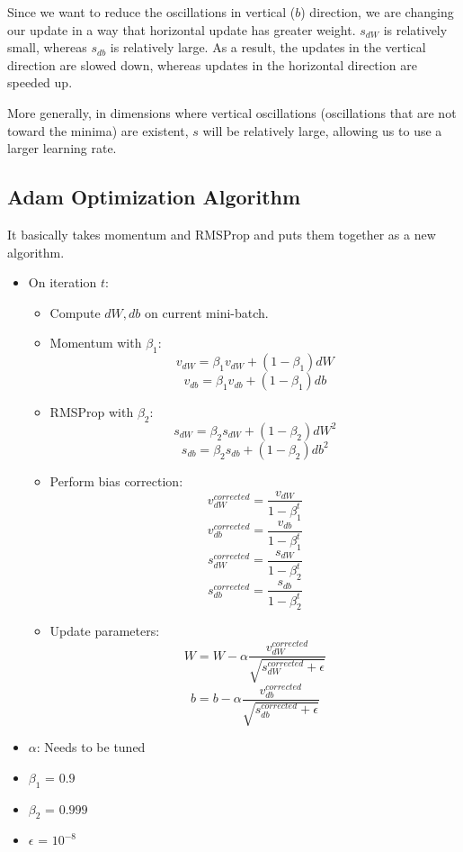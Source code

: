 Since we want to reduce the oscillations in vertical ($b$) direction, we are changing our update in a way that horizontal update has greater weight. $s_{dW}$ is relatively small, whereas $s_{db}$ is relatively large. As a result, the updates in the vertical direction are slowed down, whereas updates in the horizontal direction are speeded up. 

More generally, in dimensions where vertical oscillations (oscillations that are not toward the minima) are existent, $s$ will be relatively large, allowing us to use a larger learning rate. 


\subsection{Adam Optimization Algorithm}
It basically takes momentum and RMSProp and puts them together as a new algorithm. 

\begin{itemize} 
    \item On iteration $t$:
    \begin{itemize}
        \item[] Compute $dW, db$ on current mini-batch.
        \item[] Momentum with $\beta_1$: $$v_{dW} = \beta_1 v_{dW} + (1-\beta_1)dW$$ $$v_{db} = \beta_1 v_{db} + (1-\beta_1)db$$
        \item[] RMSProp with $\beta_2$: $$s_{dW} = \beta_2 s_{dW} + (1-\beta_2)dW^2$$ $$s_{db} = \beta_2 s_{db} + (1-\beta_2)db^2$$
        \item[] Perform bias correction: 
        $$v^{corrected}_{dW} = \frac{v_{dW}}{1-\beta_1^t}$$ 
        $$v^{corrected}_{db} = \frac{v_{db}}{1-\beta_1^t}$$ 
        $$s^{corrected}_{dW} = \frac{s_{dW}}{1-\beta_2^t}$$ 
        $$s^{corrected}_{db} = \frac{s_{db}}{1-\beta_2^t}$$ 
        \item[] Update parameters: 
        $$W = W - \alpha\frac{v^{corrected}_{dW}}{\sqrt{s^{corrected}_{dW} + \epsilon}}$$ 
        $$b = b - \alpha\frac{v^{corrected}_{db}}{\sqrt{s^{corrected}_{db} + \epsilon}}$$ 
    \end{itemize}
\end{itemize}

\begin{itemize}
    \item $\alpha$: Needs to be tuned
    \item $\beta_1$ = $0.9$
    \item $\beta_2$ = $0.999$
    \item $\epsilon$ = $10^{-8}$
\end{itemize}

